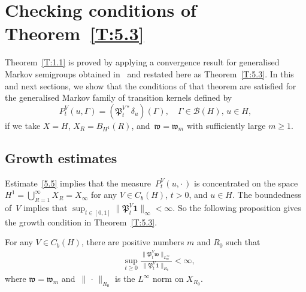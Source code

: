 \documentclass[AHL,Unicode,longabstracts]{cedram}
\newcommand{\mek}{{\mathbf 1}}
\newcommand{\ty}{\infty}
\newcommand{\de}{\delta}
\newcommand{\wwww}{{\mathfrak w}}
\newcommand{\PPPP}{{\mathfrak P}}
\newcommand{\BBBBB}{{\mathcal B}}
\begin{document}
\section{Checking conditions of Theorem~\ref{T:5.3}}\label{S:2}

Theorem~\ref{T:1.1} is proved by applying a convergence result for generalised Markov semigroups obtained in~\cite{JNPS-2014, MN-2015} and restated here as Theorem~\ref{T:5.3}. In this and next sections, we show that the conditions of that theorem are satisfied for the generalised Markov family of transition kernels defined by
\[
P_t^V(u,\Gamma)=(\PPPP_t^{V*} \de_u) (\Gamma),\quad \Gamma\in \BBBBB(H), \, u\in H,
\]
if we take $X=H$, $X_R= B_{H^1}(R)$, and~$\wwww= \wwww_m$ with sufficiently large $m\ge1$.

\subsection{Growth estimates}

Estimate~\eqref{5.5} implies that the measure~$P_{t}^V(u,{\cdot\,})$ is concentrated on the space $H^1=\bigcup_{R=1}^\ty X_R=X_\ty$ for any $V\in C_b(H)$, $t>0$, and $u\in H$. The boundedness of~$V$ implies that $\sup_{t\in[0,1]}\|\PPPP_t^V{\mek}\|_\ty<\ty$. So the following proposition gives the growth condition in Theorem~\ref{T:5.3}.

\begin{prop}\label{P:2.4}
For any $V\in C_b(H)$, there are positive numbers $m$ and $R_0$ such that
\begin{align}
&\sup_{t\ge0}
\frac{\|\PPPP_t^V\wwww\|_{L_{\wwww}^\infty}}{\|\PPPP_t^V{\mek}\|_{R_0}}<\infty,\label{a5.8}
\end{align}
where $\wwww=\wwww_m$ and~$\|{\,\cdot\,}\|_{R_0}$ is the $L^\ty$ norm on $X_{R_0}$.
\end{prop}
\end{document}
